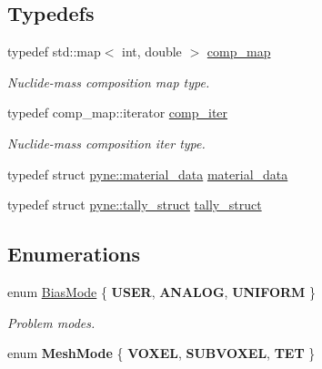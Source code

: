 \subsection*{Typedefs}
\begin{DoxyCompactItemize}
\item 
\mbox{\label{namespacepyne_a86738cecccf4ce3f4ecc2ff6f45ce1a2}} 
typedef std\+::map$<$ int, double $>$ \hyperlink{namespacepyne_a86738cecccf4ce3f4ecc2ff6f45ce1a2}{comp\+\_\+map}
\begin{DoxyCompactList}\small\item\em Nuclide-\/mass composition map type. \end{DoxyCompactList}\item 
\mbox{\label{namespacepyne_af38f60eec2c4c80e6decc75c3b21a879}} 
typedef comp\+\_\+map\+::iterator \hyperlink{namespacepyne_af38f60eec2c4c80e6decc75c3b21a879}{comp\+\_\+iter}
\begin{DoxyCompactList}\small\item\em Nuclide-\/mass composition iter type. \end{DoxyCompactList}\item 
typedef struct \hyperlink{structpyne_1_1material__data}{pyne\+::material\+\_\+data} \hyperlink{namespacepyne_a30fee8818307aa6d8d45dc33ddee6008}{material\+\_\+data}
\item 
typedef struct \hyperlink{structpyne_1_1tally__struct}{pyne\+::tally\+\_\+struct} \hyperlink{namespacepyne_a50f65e8f1e109c362c1cd737d0627941}{tally\+\_\+struct}
\end{DoxyCompactItemize}
\subsection*{Enumerations}
\begin{DoxyCompactItemize}
\item 
\mbox{\label{namespacepyne_af75379f8cb942a7e996031ee50115fb5}} 
enum \hyperlink{namespacepyne_af75379f8cb942a7e996031ee50115fb5}{Bias\+Mode} \{ {\bfseries U\+S\+ER}, 
{\bfseries A\+N\+A\+L\+OG}, 
{\bfseries U\+N\+I\+F\+O\+RM}
 \}\begin{DoxyCompactList}\small\item\em Problem modes. \end{DoxyCompactList}
\item 
\mbox{\label{namespacepyne_a8b9ac539782acf6d43b43f113e39b64b}} 
enum {\bfseries Mesh\+Mode} \{ {\bfseries V\+O\+X\+EL}, 
{\bfseries S\+U\+B\+V\+O\+X\+EL}, 
{\bfseries T\+ET}
 \}
\end{DoxyCompactItemize}
